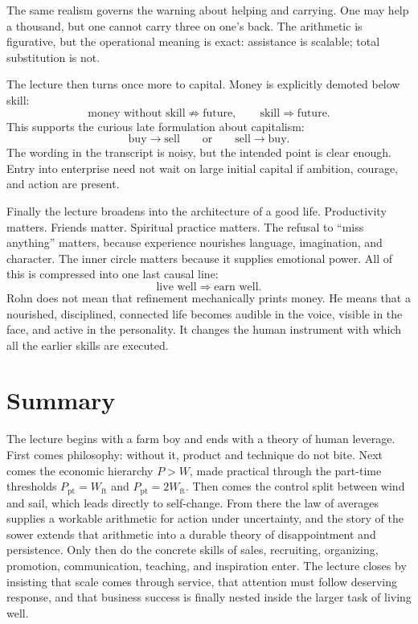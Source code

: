 The same realism governs the warning about helping and carrying. One may help a thousand, but one cannot carry three on one's back. The arithmetic is figurative, but the operational meaning is exact: assistance is scalable; total substitution is not.

The lecture then turns once more to capital. Money is explicitly demoted below skill:
\begin{equation}
\text{money without skill} \not\Rightarrow \text{future},
\qquad
\text{skill} \Rightarrow \text{future}.
\end{equation}
This supports the curious late formulation about capitalism:
\begin{equation}
\text{buy}\to\text{sell}
\qquad\text{or}\qquad
\text{sell}\to\text{buy}.
\end{equation}
The wording in the transcript is noisy, but the intended point is clear enough. Entry into enterprise need not wait on large initial capital if ambition, courage, and action are present.

Finally the lecture broadens into the architecture of a good life. Productivity matters. Friends matter. Spiritual practice matters. The refusal to ``miss anything'' matters, because experience nourishes language, imagination, and character. The inner circle matters because it supplies emotional power. All of this is compressed into one last causal line:
\begin{equation}
\text{live well} \Longrightarrow \text{earn well}.
\end{equation}
Rohn does not mean that refinement mechanically prints money. He means that a nourished, disciplined, connected life becomes audible in the voice, visible in the face, and active in the personality. It changes the human instrument with which all the earlier skills are executed.

\section{Summary}

The lecture begins with a farm boy and ends with a theory of human leverage. First comes philosophy: without it, product and technique do not bite. Next comes the economic hierarchy \(P>W\), made practical through the part-time thresholds \(P_{\mathrm{pt}}=W_{\mathrm{ft}}\) and \(P_{\mathrm{pt}}=2W_{\mathrm{ft}}\). Then comes the control split between wind and sail, which leads directly to self-change. From there the law of averages supplies a workable arithmetic for action under uncertainty, and the story of the sower extends that arithmetic into a durable theory of disappointment and persistence. Only then do the concrete skills of sales, recruiting, organizing, promotion, communication, teaching, and inspiration enter. The lecture closes by insisting that scale comes through service, that attention must follow deserving response, and that business success is finally nested inside the larger task of living well.